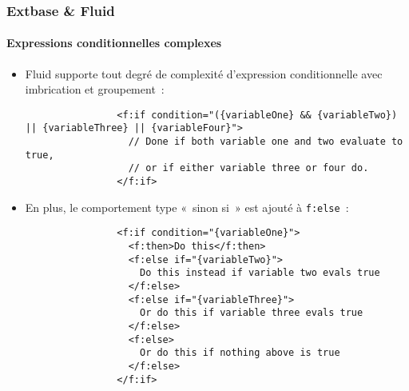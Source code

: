\begin{frame}[fragile]
	\frametitle{Extbase \& Fluid}
	\framesubtitle{Expressions conditionnelles complexes}

	\lstset{basicstyle=\tiny\ttfamily}

	\begin{itemize}

		\item Fluid supporte tout degré de complexité d'expression conditionnelle avec
			imbrication et groupement~:

			\begin{lstlisting}
				<f:if condition="({variableOne} && {variableTwo}) || {variableThree} || {variableFour}">
				  // Done if both variable one and two evaluate to true,
				  // or if either variable three or four do.
				</f:if>
			\end{lstlisting}

		\item En plus, le comportement type «~sinon si~» est ajouté à \texttt{f:else}~:

			\begin{lstlisting}
				<f:if condition="{variableOne}">
				  <f:then>Do this</f:then>
				  <f:else if="{variableTwo}">
				    Do this instead if variable two evals true
				  </f:else>
				  <f:else if="{variableThree}">
				    Or do this if variable three evals true
				  </f:else>
				  <f:else>
				    Or do this if nothing above is true
				  </f:else>
				</f:if>
			\end{lstlisting}

	\end{itemize}

\end{frame}


